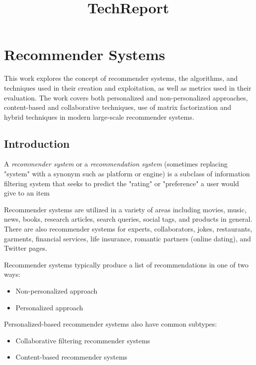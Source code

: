 \documentclass[11pt]{article}
\title{TechReport}
\providecommand{\tightlist}{%
      \setlength{\itemsep}{0pt}\setlength{\parskip}{0pt}}
\begin{document}
    
    
    \maketitle
    
    

    
    \section{Recommender Systems}\label{recommender-systems}

    This work explores the concept of recommender systems, the algorithms,
and techniques used in their creation and exploitation, as well as
metrics used in their evaluation. The work covers both personalized and
non-personalized approaches, content-based and collaborative techniques,
use of matrix factorization and hybrid techniques in modern large-scale
recommender systems.

    \subsection{Introduction}\label{introduction}

    A \emph{recommender system} or a \emph{recommendation system} (sometimes
replacing "system" with a synonym such as platform or engine) is a
subclass of information filtering system that seeks to predict the
"rating" or "preference" a user would give to an item

    Recommender systems are utilized in a variety of areas including movies,
music, news, books, research articles, search queries, social tags, and
products in general. There are also recommender systems for experts,
collaborators, jokes, restaurants, garments, financial services, life
insurance, romantic partners (online dating), and Twitter pages.

    Recommender systems typically produce a list of recommendations in one
of two ways:

\begin{itemize}
\tightlist
\item
  Non-personalized approach
\item
  Personalized approach
\end{itemize}

    Personalized-based recommender systems also have common subtypes:

\begin{itemize}
\tightlist
\item
  Collaborative filtering recommender systems
\item
  Content-based recommender systems
\end{itemize}
\end{document}
